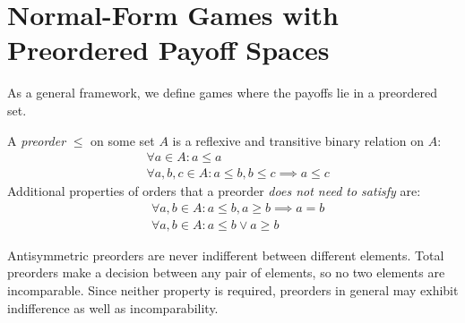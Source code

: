 \documentclass[a4paper]{scrreprt}
\begin{document}
    \section{Normal-Form Games with Preordered Payoff Spaces}
    \label{sec:preorderedPayoffSpaceGames}    
    As a general framework, we define games where the payoffs lie in a preordered set.
    \begin{defn}[Preorder]
        A \emph{preorder} $\leq$ on some set $A$ is a reflexive and transitive binary relation on $A$:
        \begin{align*}
            &\forall a \in A: a \leq a \tag{Reflexivity} \\
            &\forall a, b, c \in A: a \leq b, b \leq c \implies a \leq c \tag{Transitivity}
        \end{align*}
        Additional properties of orders that a preorder \emph{does not need to satisfy} are:
        \begin{align*}
            &\forall a, b \in A: a \leq b, a \geq b \implies a = b \tag{Antisymmetry} \\
            &\forall a, b \in A: a \leq b \vee a \geq b \tag{Totality}
        \end{align*}
    \end{defn}
    Antisymmetric preorders are never indifferent between different elements. Total preorders make a decision between any pair of elements, so no two elements are incomparable. Since neither property is required, preorders in general may exhibit indifference as well as incomparability.
    
    
    \let\popref\geq
    \let\pononpref\leq
    \let\postrpref>
    \let\postrnonpref<    
\end{document}
